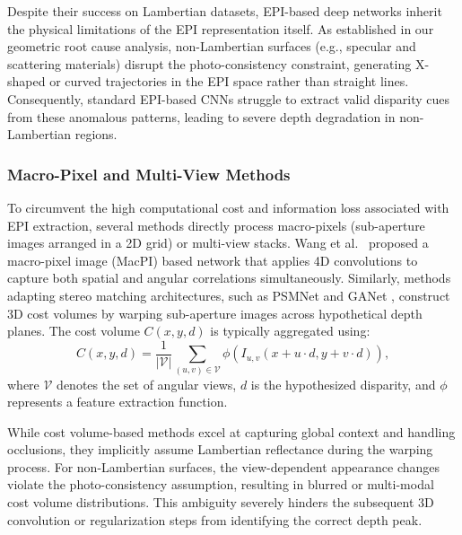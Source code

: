 Despite their success on Lambertian datasets, EPI-based deep networks inherit the physical limitations of the EPI representation itself. As established in our geometric root cause analysis, non-Lambertian surfaces (e.g., specular and scattering materials) disrupt the photo-consistency constraint, generating X-shaped or curved trajectories in the EPI space rather than straight lines. Consequently, standard EPI-based CNNs struggle to extract valid disparity cues from these anomalous patterns, leading to severe depth degradation in non-Lambertian regions.

\subsubsection{Macro-Pixel and Multi-View Methods}
To circumvent the high computational cost and information loss associated with EPI extraction, several methods directly process macro-pixels (sub-aperture images arranged in a 2D grid) or multi-view stacks. Wang et al.\ \cite{wang2018occlusion} proposed a macro-pixel image (MacPI) based network that applies 4D convolutions to capture both spatial and angular correlations simultaneously. Similarly, methods adapting stereo matching architectures, such as PSMNet \cite{chang2018pyramid} and GANet \cite{zhang2019ga}, construct 3D cost volumes by warping sub-aperture images across hypothetical depth planes. The cost volume $C(x, y, d)$ is typically aggregated using:
\begin{equation}
C(x, y, d) = \frac{1}{|\mathcal{V}|} \sum_{(u,v) \in \mathcal{V}} \phi(I_{u,v}(x + u \cdot d, y + v \cdot d)),
\label{eq:ch2_3}
\end{equation}
where $\mathcal{V}$ denotes the set of angular views, $d$ is the hypothesized disparity, and $\phi$ represents a feature extraction function.

While cost volume-based methods excel at capturing global context and handling occlusions, they implicitly assume Lambertian reflectance during the warping process. For non-Lambertian surfaces, the view-dependent appearance changes violate the photo-consistency assumption, resulting in blurred or multi-modal cost volume distributions. This ambiguity severely hinders the subsequent 3D convolution or regularization steps from identifying the correct depth peak.

